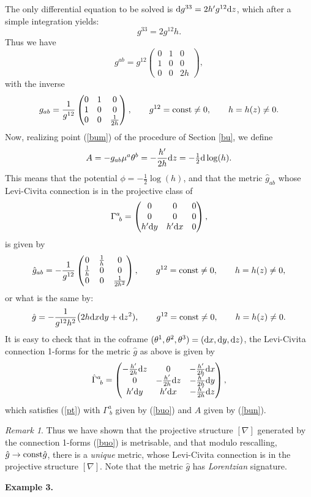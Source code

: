 \documentclass[letterpaper]{amsart}
\theoremstyle{definition}
\theoremstyle{remark}
\newtheorem{remark}[theorem]{Remark}
\newcommand{\be}{\begin{equation}}
\newcommand{\ee}{\end{equation}}
\newcommand{\der}{{\rm d}}
\newcommand{\bma}{\begin{pmatrix}}
\newcommand{\ema}{\end{pmatrix}}
\begin{document}
The only differential equation to be solved is $\der g^{33}=2h'
g^{12}\der z$, which after a simple integration yields: 
$$g^{33}=2g^{12}h.$$
Thus we have 
$$g^{ab}=g^{12}\bma 0&1&0\\1&0&0\\0&0&2h\ema, $$
with the inverse
$$g_{ab}=\frac{1}{g^{12}}\bma
0&1&0\\1&0&0\\0&0&\frac{1}{2h}\ema,\quad\quad g^{12}={\rm const}\neq
0,\quad\quad h=h(z)\neq 0.$$
Now, realizing point (\ref{bum}) of the procedure of Section \ref{bu},
we define 
\be
A=-g_{ab}\mu^a\theta^b=-\frac{h'}{2h}\der z=-\tfrac12 \der\log(h).\label{bun}\ee
This means that the potential $\phi=-\tfrac12 \log(h)$, and that the
metric $\hat{g}_{ab}$ whose Levi-Civita connection is in the projective
class of 
\be
\Gamma^a_{~b}= \bma 0&0& 0\\
0&0 &0\\
h'\der y&h'\der x&0\ema,\label{buo}\ee
is given by
$$\hat{g}_{ab}=-\frac{1}{g^{12}}\bma
0&\frac{1}{h}&0\\\frac{1}{h}&0&0\\0&0&\frac{1}{2h^2}\ema,\quad\quad g^{12}={\rm const}\neq
0,\quad\quad h=h(z)\neq 0,$$
or what is the same by:
$$\hat{g}=-\frac{1}{g^{12}h^2}\big(2h\der x\der y+\der z^2),\quad\quad g^{12}={\rm const}\neq
0,\quad\quad h=h(z)\neq 0.$$
It is easy to check that in the coframe
$(\theta^1,\theta^2,\theta^3)=(\der x,\der y,\der z)$, the Levi-Civita
connection 1-forms for the metric $\hat{g}$ as above is given by
$$\hat{\Gamma}^a_{~b}=\bma
-\frac{h'}{2h}\der z&0&-\frac{h'}{2h}\der x\\
0&-\frac{h'}{2h}\der z&-\frac{h'}{2h}\der y\\
h'\der y&h'\der x&-\frac{h'}{2h}\der z
\ema,
$$
which satisfies (\ref{pt}) with $\Gamma^a_{~b}$ given by (\ref{buo})
and $A$ given by (\ref{bun}). 
\begin{remark}
Thus we have shown that the projective structure $[\nabla]$ 
generated by the
connection 1-forms (\ref{buo}) is metrisable, and that modulo
rescalling, $\hat{g}\to {\rm const}\hat{g}$, there is a \emph{unique}
metric, whose Levi-Civita connection is in the projective structure
$[\nabla]$. Note that the metric $\hat{g}$ has \emph{Lorentzian}
signature. 
\end{remark}
{\bf Example 3.} 
\end{document}
